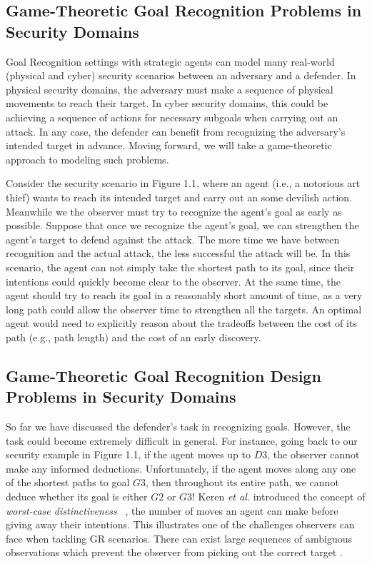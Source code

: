 \subsection{Game-Theoretic Goal Recognition Problems in Security Domains}
Goal Recognition settings with strategic agents can model 
many real-world (physical and cyber) security scenarios between 
an adversary and a defender.  
In physical security domains, the adversary 
must make a sequence of 
physical movements to reach their target. 
In cyber security domains, this could be achieving a sequence of 
actions for necessary subgoals when carrying out an attack. 
In any case, the defender can benefit from recognizing the adversary's intended target in advance. 
Moving forward, we will take a game-theoretic approach to modeling such problems.

Consider the security scenario in Figure 1.1,
where an agent (i.e., a notorious art thief) wants to reach its intended target and carry out an some devilish action. Meanwhile we the observer must try to recognize the agent's goal as early as possible. 
Suppose that once we recognize the agent's goal, we can strengthen the agent's target to defend against the attack. 
The more time we have between recognition and the actual attack, the less successful the attack will be. 
In this scenario, the agent can not simply take the shortest path to its goal, since their intentions could quickly become clear to the observer.
At the same time, the agent should try to reach its goal in a reasonably short amount of time, 
as a very long path could allow the observer time to strengthen all the targets.
An optimal agent would need to explicitly reason about the tradeoffs 
between the cost of its path (e.g., path length) and the cost of an early discovery.

\subsection{Game-Theoretic Goal Recognition Design Problems in Security Domains}
So far we have discussed the defender's task in recognizing goals. 
However, the task could become extremely difficult in general. 
For instance, going back to our security example in Figure 1.1, 
if the agent moves up to $D3$, the observer cannot make any informed deductions. 
Unfortunately, if the agent moves along any one of the shortest paths to goal $G3$, then
throughout its entire path, we cannot deduce whether its goal is either $G2$ or $G3$!  Keren \emph{et al.} introduced the concept
of \emph{worst-case distinctiveness} ~\cite{keren:14}, the number of moves an agent can make before giving away their intentions.
This illustrates one of the challenges observers can face when tackling GR scenarios. There can exist large sequences of 
ambiguous observations which prevent the observer from picking out the correct target . 


